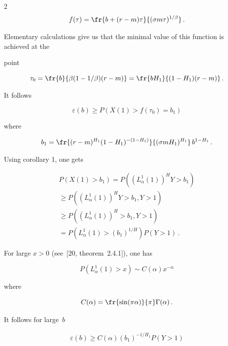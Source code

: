\begin{multicols}{2}
$$

f(\tau ) = \fr{b+(r-m)\tau}{(\sigma m \tau )^{1/\beta}}\,.

$$

Elementary calculations give us that the minimal value of this function is achieved at the 

point 

$$

\tau_0 = \fr{b}{\beta (1-1/\beta )(r-m)} = \fr{b H_1}{(1-H_1 ) (r-m)} \,. 

$$

It follows 

$$

\varepsilon (b) \geq P(X(1) > f(\tau_0 ) = b_1 ) 

$$ 

where 

$$

b_1 = \fr{(r-m)^{H_1} (1-H_1 )^{-(1-H_1 )} }{(\sigma m H_1 )^{H_1 } } \, b^{1-H_1} \,. 

$$

Using corollary 1, one gets 

\begin{multline*}

P(X(1) > b_1 ) = P((L_{\alpha}^1 (1))^H Y >b_1 ) \\

{}\geq  

P((L_{\alpha}^1 (1))^H Y >b_1 , Y>1) \\

{}\geq

P((L_{\alpha}^1 (1))^H >b_1 , Y>1)\\ = P(L_{\alpha}^1 (1) 

>(b_1 )^{1/H} ) P(Y>1) \,. 

\end{multline*}

For large $x>0$ (see~[20, theorem~2.4.1]), one has 

$$

 P(L_{\alpha}^1 (1) > x ) \sim C(\alpha ) x^{-\alpha} 

$$

where 

$$

C(\alpha ) = \fr{\sin (\pi\alpha )}{\pi} \Gamma (\alpha )\,.

$$

It follows for large~$b$ 

\begin{multline*}

\varepsilon (b) \geq C(\alpha ) (b_1 )^{-1/H_1} P(Y>1)\\


\end{multline*}
\end{multicols}
